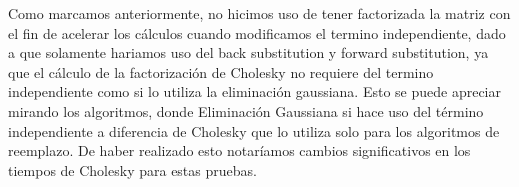 Como marcamos anteriormente, no hicimos uso de tener factorizada la matriz con el fin de acelerar los cálculos cuando modificamos el termino independiente, dado a que solamente hariamos uso del back substitution y forward substitution, ya que el cálculo de la factorización de Cholesky no requiere del termino independiente como si lo utiliza la eliminación gaussiana. Esto se puede apreciar mirando los algoritmos, donde Eliminación Gaussiana si hace uso del término independiente a diferencia de Cholesky que lo utiliza solo para los algoritmos de reemplazo. De haber realizado esto notaríamos cambios significativos en los tiempos de Cholesky para estas pruebas.

